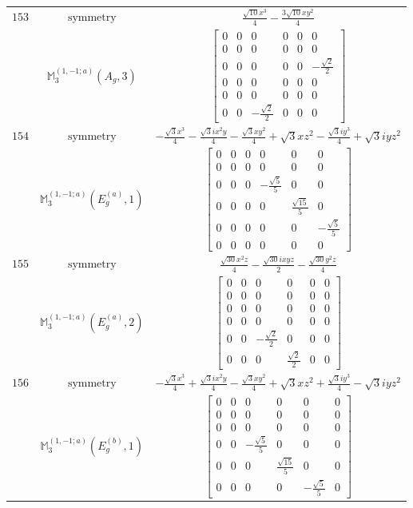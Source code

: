 \documentclass[fleqn,8pt,landscape]{jsarticle}
\begin{document}
\begin{longtable}{ccc}
$ 153 $ & $ \text{symmetry} $ & $ \frac{\sqrt{10} x^{3}}{4} - \frac{3 \sqrt{10} x y^{2}}{4} $ \\
$  $ & $ \mathbb{M}_{3}^{(1,-1;a)}(A_{g},3) $ & $ \begin{bmatrix} 0 & 0 & 0 & 0 & 0 & 0 \\ 0 & 0 & 0 & 0 & 0 & 0 \\ 0 & 0 & 0 & 0 & 0 & - \frac{\sqrt{2}}{2} \\ 0 & 0 & 0 & 0 & 0 & 0 \\ 0 & 0 & 0 & 0 & 0 & 0 \\ 0 & 0 & - \frac{\sqrt{2}}{2} & 0 & 0 & 0 \end{bmatrix} $ \\ \hline
$ 154 $ & $ \text{symmetry} $ & $ - \frac{\sqrt{3} x^{3}}{4} - \frac{\sqrt{3} i x^{2} y}{4} - \frac{\sqrt{3} x y^{2}}{4} + \sqrt{3} x z^{2} - \frac{\sqrt{3} i y^{3}}{4} + \sqrt{3} i y z^{2} $ \\
$  $ & $ \mathbb{M}_{3}^{(1,-1;a)}(E_{g}^{(a)},1) $ & $ \begin{bmatrix} 0 & 0 & 0 & 0 & 0 & 0 \\ 0 & 0 & 0 & 0 & 0 & 0 \\ 0 & 0 & 0 & - \frac{\sqrt{5}}{5} & 0 & 0 \\ 0 & 0 & 0 & 0 & \frac{\sqrt{15}}{5} & 0 \\ 0 & 0 & 0 & 0 & 0 & - \frac{\sqrt{5}}{5} \\ 0 & 0 & 0 & 0 & 0 & 0 \end{bmatrix} $ \\ \hline
$ 155 $ & $ \text{symmetry} $ & $ \frac{\sqrt{30} x^{2} z}{4} - \frac{\sqrt{30} i x y z}{2} - \frac{\sqrt{30} y^{2} z}{4} $ \\
$  $ & $ \mathbb{M}_{3}^{(1,-1;a)}(E_{g}^{(a)},2) $ & $ \begin{bmatrix} 0 & 0 & 0 & 0 & 0 & 0 \\ 0 & 0 & 0 & 0 & 0 & 0 \\ 0 & 0 & 0 & 0 & 0 & 0 \\ 0 & 0 & 0 & 0 & 0 & 0 \\ 0 & 0 & - \frac{\sqrt{2}}{2} & 0 & 0 & 0 \\ 0 & 0 & 0 & \frac{\sqrt{2}}{2} & 0 & 0 \end{bmatrix} $ \\ \hline
$ 156 $ & $ \text{symmetry} $ & $ - \frac{\sqrt{3} x^{3}}{4} + \frac{\sqrt{3} i x^{2} y}{4} - \frac{\sqrt{3} x y^{2}}{4} + \sqrt{3} x z^{2} + \frac{\sqrt{3} i y^{3}}{4} - \sqrt{3} i y z^{2} $ \\
$  $ & $ \mathbb{M}_{3}^{(1,-1;a)}(E_{g}^{(b)},1) $ & $ \begin{bmatrix} 0 & 0 & 0 & 0 & 0 & 0 \\ 0 & 0 & 0 & 0 & 0 & 0 \\ 0 & 0 & 0 & 0 & 0 & 0 \\ 0 & 0 & - \frac{\sqrt{5}}{5} & 0 & 0 & 0 \\ 0 & 0 & 0 & \frac{\sqrt{15}}{5} & 0 & 0 \\ 0 & 0 & 0 & 0 & - \frac{\sqrt{5}}{5} & 0 \end{bmatrix} $ \\ \hline

\end{longtable}
\end{document}
